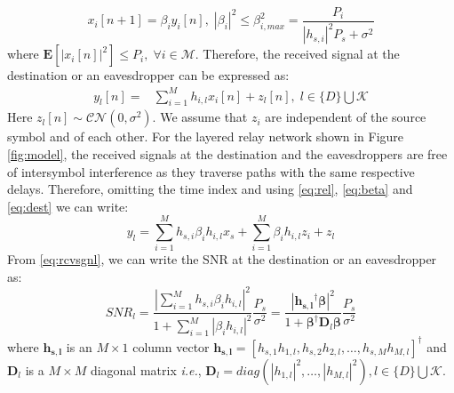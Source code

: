 \documentclass[journal,,draftclsnofoot letterpaper, onecolumn]{IEEEtran}
\begin{document}
\begin{equation}
\label{eq:beta}
x_i[n+1]=\beta_i y_i[n],\;|\beta_i|^2 \le \beta_{i,max}^2= \frac{P_i}{|h_{s,i}|^2 P_s + \sigma^2}
\end{equation}
where 
$\mathbf{E}[|x_i[n]|^2] \le P_i,\;\forall i \in \mathcal{M}$. Therefore, the received signal at the destination or an eavesdropper can be expressed as:
\begin{align}
y_l[n] = & \sum\limits_{i=1}^{M}h_{i,l}x_i[n]+z_l[n],\;l \in \{D\}\bigcup \mathcal{K} \label{eq:dest}
\end{align}
Here $z_l[n] \sim \mathcal{CN}(0,\sigma^2)$. We assume that $z_i$ are independent of the source symbol and of each other. For the layered relay network shown in Figure \ref{fig:model}, 
the received signals at the destination and the eavesdroppers are free of intersymbol interference as they traverse paths with the same respective delays. Therefore, omitting the time index and using \eqref{eq:rel}, \eqref{eq:beta} and \eqref{eq:dest} we can write:
\begin{equation}\label{eq:rcvsgnl}
y_l=\sum\limits_{i=1}^{M}h_{s,i}\beta_ih_{i,l}x_s + \sum\limits_{i=1}^{M}\beta_ih_{i,l}z_i + z_l
\end{equation}
From \eqref{eq:rcvsgnl}, we can write the SNR at the destination or an eavesdropper as:
\begin{equation*}
SNR_l=  \frac{\left|\sum\limits_{i=1}^{M} h_{s,i}\beta_ih_{i,l}\right|^2}{1 + \sum\limits_{i=1}^{M}|\beta_i h_{i,l}|^2}\frac{P_s}{\sigma^2}=\frac{|\mathbf{h_{s,l}}^\dagger\bm{\beta}|^2}{1+\bm{\beta}^\dagger \mathbf{D}_l\bm{\beta}}\frac{P_s}{\sigma^2}
\end{equation*} 
where $\mathbf{h_{s,l}}$ is an $M \times 1$ column vector $\mathbf{h_{s,l}}=[h_{s,1}h_{1,l},h_{s,2}h_{2,l},\ldots,h_{s,M}h_{M,l}]^\dagger $ and $\mathbf{D}_l$ is a $M \times M$ diagonal matrix \textit{i.e.}, $\mathbf{D}_l = diag(|h_{1,l}|^2, \ldots, |h_{M,l}|^2), l \in \{D\} \bigcup \mathcal{K}$.
  
\end{document}
